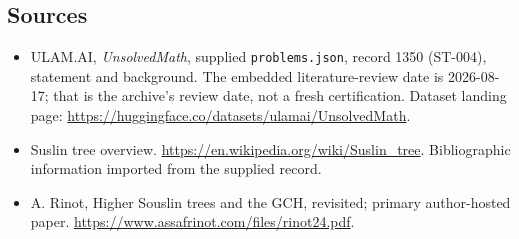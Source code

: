 \documentclass[11pt,a4paper]{article}
\begin{document}
\subsection{Sources}

{\small

\begin{itemize}

\item[\hypertarget{source:1350:1}{S1}] ULAM.AI, \emph{UnsolvedMath}, supplied \texttt{problems.json}, record 1350 (ST-004), statement and background. The embedded literature-review date is 2026-08-17; that is the archive’s review date, not a fresh certification. Dataset landing page: \url{https://huggingface.co/datasets/ulamai/UnsolvedMath}.

\item[\hypertarget{source:1350:2}{S2}] Suslin tree overview. \url{https://en.wikipedia.org/wiki/Suslin_tree}. Bibliographic information imported from the supplied record.

\item[R1] A. Rinot, Higher Souslin trees and the GCH, revisited; primary author-hosted paper.
\url{https://www.assafrinot.com/files/rinot24.pdf}.
\end{itemize}

}

\label{end:1350}
\end{document}
